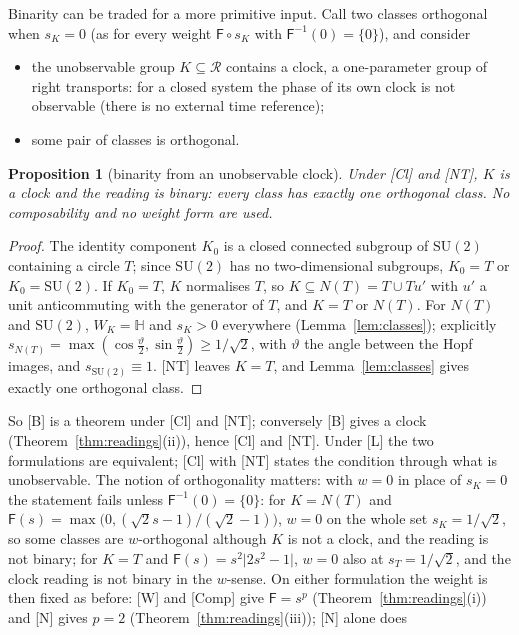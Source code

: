 \documentclass[aps,pra,onecolumn,superscriptaddress,nofootinbib,10pt]{revtex4-2}
\newtheorem{proposition}[theorem]{Proposition}
\theoremstyle{definition}
\theoremstyle{remark}
\newcommand{\HH}{\mathbb{H}}
\newcommand{\cR}{\mathcal{R}}
\newcommand{\SU}{\mathrm{SU}}
\begin{document}
Binarity can be traded for a more primitive input.  Call two classes orthogonal when $s_K=0$ (as for
every weight $\mathsf F\circ s_K$ with $\mathsf F^{-1}(0)=\{0\}$), and consider
\begin{itemize}[leftmargin=3.2em]
\item[{[Cl]}] the unobservable group $K\subseteq\cR$ contains a clock, a one-parameter group of right
transports: for a closed system the phase of its own clock is not observable (there is no external time
reference);
\item[{[NT]}] some pair of classes is orthogonal.
\end{itemize}

\begin{proposition}[binarity from an unobservable clock]\label{prop:clockB}
Under [Cl] and [NT], $K$ is a clock and the reading is binary: every class has exactly one orthogonal
class.  No composability and no weight form are used.
\end{proposition}
\begin{proof}
The identity component $K_0$ is a closed connected subgroup of $\SU(2)$ containing a circle $T$; since
$\SU(2)$ has no two-dimensional subgroups, $K_0=T$ or $K_0=\SU(2)$.  If $K_0=T$, $K$ normalises $T$, so
$K\subseteq N(T)=T\cup Tu'$ with $u'$ a unit anticommuting with the generator of $T$, and $K=T$ or $N(T)$.  For
$N(T)$ and $\SU(2)$, $W_K=\HH$ and $s_K>0$ everywhere (Lemma~\ref{lem:classes}); explicitly
$s_{N(T)}=\max(\cos\frac\vartheta2,\sin\frac\vartheta2)\ge1/\sqrt2$, with $\vartheta$ the angle between the Hopf images, and
$s_{\SU(2)}\equiv1$.  [NT] leaves $K=T$, and Lemma~\ref{lem:classes} gives exactly one orthogonal class.
\end{proof}
So [B] is a theorem under [Cl] and [NT]; conversely [B] gives a clock (Theorem~\ref{thm:readings}(ii)), hence [Cl]
and [NT].  Under [L] the two formulations are equivalent; [Cl] with [NT] states the condition through
what is unobservable.  The notion of orthogonality matters: with $w=0$ in place of $s_K=0$ the statement
fails unless $\mathsf F^{-1}(0)=\{0\}$: for
$K=N(T)$ and $\mathsf F(s)=\max\bigl(0,(\sqrt2s-1)/(\sqrt2-1)\bigr)$, $w=0$ on the whole set $s_K=1/\sqrt2$, so some classes
are $w$-orthogonal although $K$ is not a clock, and the reading is not binary; for $K=T$ and
$\mathsf F(s)=s^2\lvert2s^2-1\rvert$, $w=0$ also at $s_T=1/\sqrt2$, and the clock reading is not binary in the $w$-sense.
On either formulation the weight is then fixed as before: [W] and [Comp] give
$\mathsf F=s^p$ (Theorem~\ref{thm:readings}(i)) and [N] gives $p=2$ (Theorem~\ref{thm:readings}(iii)); [N] alone does
\end{document}
